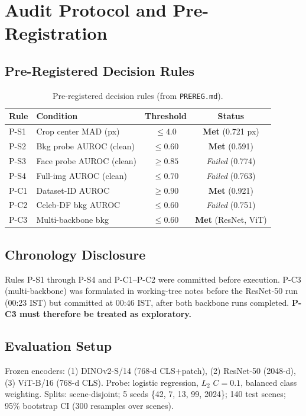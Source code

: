 \documentclass[10pt,twocolumn]{article}
\begin{document}
\section{Audit Protocol and Pre-Registration}

\subsection{Pre-Registered Decision Rules}

\begin{table}[h]
\small
\centering
\caption{Pre-registered decision rules (from \texttt{PREREG.md}).}
\begin{tabular}{llcc}
\toprule
Rule & Condition & Threshold & Status \\
\midrule
P-S1 & Crop center MAD (px) & $\leq 4.0$ & \textbf{Met} (0.721 px) \\
P-S2 & Bkg probe AUROC (clean) & $\leq 0.60$ & \textbf{Met} (0.591) \\
P-S3 & Face probe AUROC (clean) & $\geq 0.85$ & \textit{Failed} (0.774) \\
P-S4 & Full-img AUROC (clean) & $\leq 0.70$ & \textit{Failed} (0.763) \\
P-C1 & Dataset-ID AUROC & $\geq 0.90$ & \textbf{Met} (0.921) \\
P-C2 & Celeb-DF bkg AUROC & $\leq 0.60$ & \textit{Failed} (0.751) \\
P-C3 & Multi-backbone bkg & $\leq 0.60$ & \textbf{Met} (ResNet, ViT) \\
\bottomrule
\end{tabular}
\end{table}

\subsection{Chronology Disclosure}
Rules P-S1 through P-S4 and P-C1--P-C2 were committed before execution.
P-C3 (multi-backbone) was formulated in working-tree notes before the ResNet-50 run (00:23 IST) but committed at 00:46 IST, after both backbone runs completed.
\textbf{P-C3 must therefore be treated as exploratory.}

\subsection{Evaluation Setup}
Frozen encoders: (1) DINOv2-S/14 (768-d CLS+patch), (2) ResNet-50 (2048-d), (3) ViT-B/16 (768-d CLS).
Probe: logistic regression, $L_2$ $C=0.1$, balanced class weighting.
Splits: scene-disjoint; 5 seeds \{42, 7, 13, 99, 2024\}; 140 test scenes; 95\% bootstrap CI (300 resamples over scenes).
\end{document}
